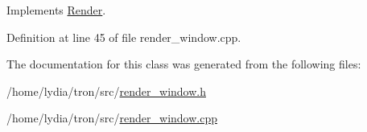 Implements \hyperlink{class_render_aa6fe6cc6f3d5ed00e490703a60fd4e4d}{Render}.



Definition at line 45 of file render\+\_\+window.\+cpp.



The documentation for this class was generated from the following files\+:\begin{DoxyCompactItemize}
\item 
/home/lydia/tron/src/\hyperlink{render__window_8h}{render\+\_\+window.\+h}\item 
/home/lydia/tron/src/\hyperlink{render__window_8cpp}{render\+\_\+window.\+cpp}\end{DoxyCompactItemize}
